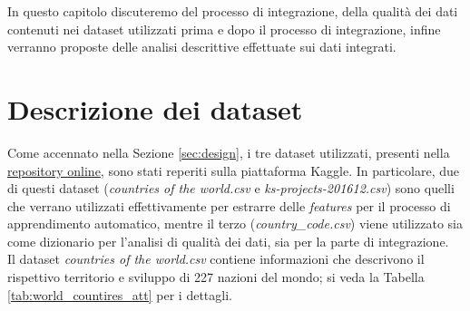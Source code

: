 In questo capitolo discuteremo del processo di integrazione, della qualità dei dati contenuti nei dataset utilizzati prima e dopo il processo di integrazione, infine verranno proposte delle analisi descrittive effettuate sui dati integrati. 
\section{Descrizione dei dataset}
Come accennato nella Sezione \ref{sec:design}, i tre dataset utilizzati, presenti nella \href{https://gitlab.com/Daniele-Papetti/kickstarterprediction}{repository online}, sono stati reperiti sulla piattaforma Kaggle.
In particolare, due di questi dataset (\textit{countries of the world.csv} e \textit{ks-projects-201612.csv}) sono quelli che verrano utilizzati effettivamente per estrarre delle \textit{features} per il processo di apprendimento automatico, mentre il terzo (\textit{country\_code.csv}) viene utilizzato sia come dizionario per l'analisi di qualità dei dati, sia per la parte di integrazione.\\
Il dataset \textit{countries of the world.csv} contiene informazioni che descrivono il rispettivo territorio e sviluppo di 227 nazioni del mondo; si veda la Tabella \ref{tab:world_countires_att} per i dettagli.
